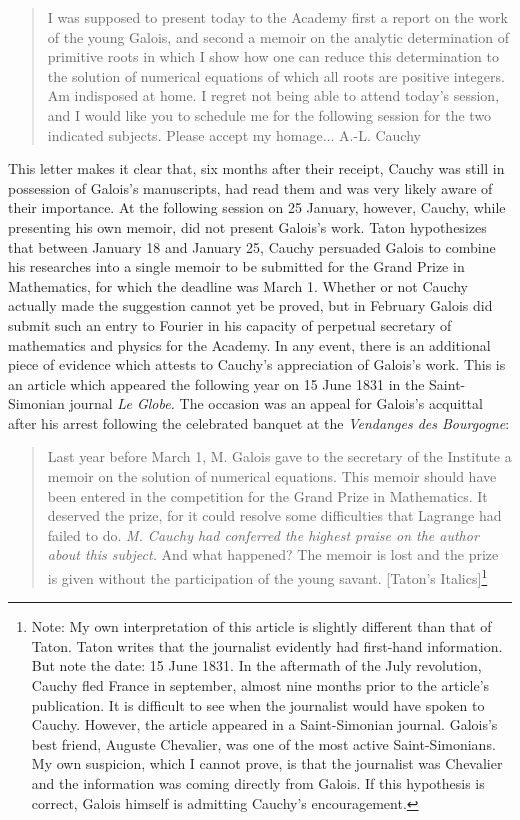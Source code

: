 \documentclass[12pt]{article}
\begin{document}
\begin{quote}
I was supposed to present today to the Academy first a report on the work of the young Galois, and second a memoir on the analytic determination of primitive roots in which I show how one can reduce this determination to the solution of numerical equations of which all roots are positive integers. Am indisposed at home. I regret not being able to attend today's session, and I would like you to schedule me for the following session for the two indicated subjects. Please accept my homage...  \hfill A.-L. Cauchy
\end{quote}
This letter makes it clear that, six months after their receipt, Cauchy was still in possession of Galois's manuscripts, had read them and was very likely aware of their importance. At the following session on 25 January, however, Cauchy, while presenting his own memoir, did not present Galois's work. Taton hypothesizes that between January 18 and January 25, Cauchy persuaded Galois to combine his researches into a single memoir to be submitted for the Grand Prize in Mathematics, for which the deadline was March 1. Whether or not Cauchy actually made the suggestion cannot yet be proved, but in February Galois did submit such an entry to Fourier in his capacity of perpetual secretary of mathematics and physics for the Academy. In any event, there is an additional piece of evidence which attests to Cauchy's appreciation of Galois's work. This is an article which appeared the following year on 15 June 1831 in the Saint-Simonian journal {\em Le Globe.} The occasion was an appeal for Galois's acquittal after his arrest following the celebrated banquet at the \emph{Vendanges des Bourgogne}:

\begin{quote}
Last year before March 1, M. Galois gave to the secretary of the Institute a memoir on the solution of numerical equations. This memoir should have been entered in the competition for the Grand Prize in Mathematics. It deserved the prize, for it could resolve some difficulties that Lagrange had failed to do. \emph{M. Cauchy had conferred the highest praise on the author about this subject.} And what happened? The memoir is lost and the prize is given without the participation of the young savant. [Taton's Italics]\footnote{Note: My own interpretation of this article is slightly different than that of Taton. Taton writes that the journalist evidently had first-hand information. But note the date: 15 June 1831. In the aftermath of the July revolution, Cauchy fled France in september, almost nine months prior to the article's publication. It is difficult to see when the journalist would have spoken to Cauchy. However, the article appeared in a Saint-Simonian journal. Galois's best friend, Auguste Chevalier, was one of the most active Saint-Simonians. My own suspicion, which I cannot prove, is that the journalist was Chevalier and the information was coming directly from Galois. If this hypothesis is correct, Galois himself is admitting Cauchy's encouragement.}
\end{quote}
\end{document}
